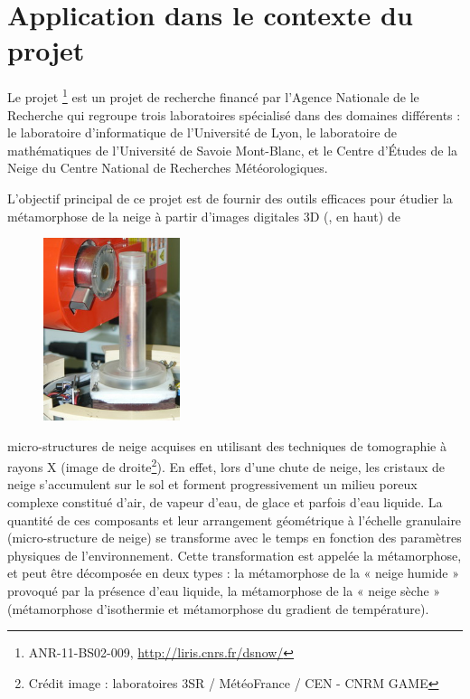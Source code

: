 %
%
%
\section{Application dans le contexte du projet \digitalSnow}%
\label{sec:applications:digitalsnow}
%
Le projet \digitalSnow\footnote{ANR-11-BS02-009,
\url{http://liris.cnrs.fr/dsnow/}} est un projet de recherche financé par
l'Agence Nationale de le Recherche qui regroupe trois laboratoires spécialisé
dans des domaines différents : le laboratoire d'informatique
\textsc{} de l'Université de Lyon, le laboratoire de
mathématiques \textsc{} de l'Université de Savoie Mont-Blanc, et
le Centre d'Études de la Neige \textsc{} du Centre National de
Recherches Météorologiques.


L'objectif principal de ce projet est de fournir des outils efficaces pour
étudier la métamorphose de la neige à partir d'images digitales 3D
(, en haut) de
%
\begin{figure}
	\includegraphics[width=4cm]{images/digitalSnow/YTEjpE}
\end{figure}
%
micro-structures de neige acquises en utilisant des techniques de tomographie à
rayons X (image de droite\footnote{Crédit image : laboratoires 3SR / MétéoFrance / CEN - CNRM GAME}). En effet,
lors d'une chute de neige, les cristaux de neige s'accumulent sur le sol et
forment progressivement un milieu poreux complexe constitué d'air, de vapeur
d'eau, de glace et parfois d'eau liquide. La quantité de ces composants et leur
arrangement géométrique à l'échelle granulaire (micro-structure de neige) se
transforme avec le temps en fonction des paramètres physiques de
l'environnement. Cette transformation est appelée la métamorphose, et peut être
décomposée en deux types : la métamorphose de la « neige humide » provoqué par
la présence d'eau liquide, la métamorphose de la « neige sèche » (métamorphose
d'isothermie et métamorphose du gradient de température).

